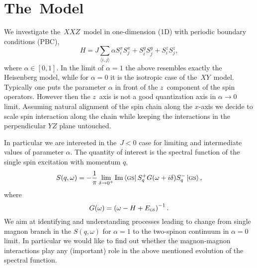 \documentclass[12pt, a4paper]{article}
\newcommand{\mean}[1]{\langle#1\rangle}
\begin{document}
\section{The~Model}
We investigate the~$XXZ$~model in one-dimension (1D) with periodic boundary conditions (PBC),
\begin{equation}
H = J\sum_{\mean{i,j}} \alpha S_i^x S_j^x + S_i^y S_j^y + S_i^z S_j^z,
\end{equation}
where $\alpha \in [0, 1]$. In the limit of $\alpha = 1$ the above resembles exactly the Heisenberg model, while for $\alpha = 0$ it is the isotropic case of the~$XY$~model. Typically one puts the parameter $\alpha$ in front of the $z$~component of the spin operators. However then the $z$~axis is not a good quantization axis in $\alpha \to 0$ limit. Assuming natural alignment of the spin chain along the $x$-axis we decide to scale spin interaction along the chain while keeping the interactions in the perpendicular $YZ$ plane untouched.

In particular we are interested in the~$J < 0$ case for limiting and intermediate values of parameter $\alpha$. The quantity of interest is the spectral function of the single spin excitation with momentum $q$,
\begin{equation}
S(q,\omega) = -\frac{1}{\pi} \lim_{\delta\to 0^+} \Im\bra{\textsc{gs}}S_q^+ G(\omega + i\delta) S_q^- \ket{\textsc{gs}},
\end{equation}
where
\begin{equation}
G(\omega) = \left(\omega - H + E_{\textsc{gs}}\right)^{-1}.
\end{equation}
We aim at identifying and understanding processes leading to change from single magnon branch in the $S(q,\omega)$ for $\alpha = 1$ to the two-spinon continuum in $\alpha = 0$ limit. In particular we would like to find out whether the magnon-magnon interactions play any (important) role in the above mentioned evolution of the spectral function.
\end{document}
